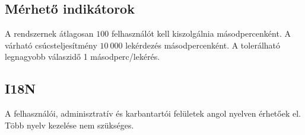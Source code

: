 \subsection{Mérhető indikátorok}
A rendszernek átlagosan $100$ felhasználót kell kiszolgálnia másodpercenként. A várható csúcsteljesítmény $10~000$ lekérdezés másodpercenként. A tolerálható legnagyobb válaszidő 1 másodperc/lekérés.


\subsection{I18N}
A felhasználói, adminisztratív és karbantartói felületek angol nyelven érhetőek el. Több nyelv kezelése nem szükséges.
